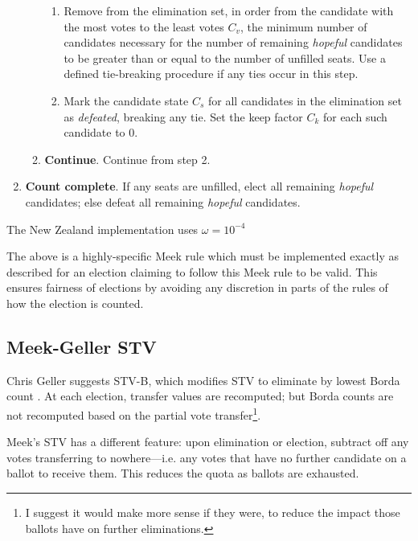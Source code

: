 \begin{enumerate}
\begin{enumerate}
\begin{enumerate}
            \item Remove from the elimination set, in order from the candidate with the most votes to the least votes $C_v$, the minimum number of candidates necessary for the number of remaining \textit{hopeful} candidates to be greater than or equal to the number of unfilled seats.  Use a defined tie-breaking procedure if any ties occur in this step.

            \item Mark the candidate state $C_s$ for all candidates in the elimination set as \textit{defeated}, breaking any tie.  Set the keep factor $C_k$ for each such candidate to 0.
        \end{enumerate}

        \item \textbf{Continue}.  Continue from step 2.

    \end{enumerate}

    \item \textbf{Count complete}.  If any seats are unfilled, elect all remaining \textit{hopeful} candidates; else defeat all remaining \textit{hopeful} candidates.
\end{enumerate}

The New Zealand implementation uses $\omega = 10^{-4}$

The above is a highly-specific Meek rule which must be implemented exactly as described for an election claiming to follow this Meek rule to be valid.  This ensures fairness of elections by avoiding any discretion in parts of the rules of how the election is counted.

\subsection{Meek-Geller STV}

Chris Geller suggests STV-B, which modifies STV to eliminate by lowest Borda count \autocite{Geller2005}.  At each election, transfer values are recomputed; but Borda counts are not recomputed based on the partial vote transfer\footnote{I suggest it would make more sense if they were, to reduce the impact those ballots have on further eliminations.}.

Meek's STV has a different feature:  upon elimination or election, subtract off any votes transferring to nowhere—i.e. any votes that have no further candidate on a ballot to receive them.  This reduces the quota as ballots are exhausted.

